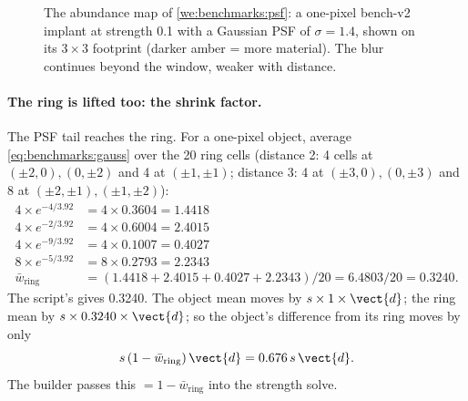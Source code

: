 \begin{figure}[htbp]
\centering
{}
\caption{The abundance map of \cref{we:benchmarks:psf}: a one-pixel bench-v2 implant at strength 0.1 with a Gaussian
PSF of $\sigma = 1.4$, shown on its $3 \times 3$ footprint (darker amber = more material). The blur continues
beyond the window, weaker with distance.}
\label{fig:benchmarks:abund}
\end{figure}

\paragraph{The ring is lifted too: the shrink factor.} The PSF tail reaches the ring. For a one-pixel object, average
\cref{eq:benchmarks:gauss} over the 20 ring cells (distance 2: 4 cells at $(\pm2,0),(0,\pm2)$ and 4 at
$(\pm1,\pm1)$; distance 3: 4 at $(\pm3,0),(0,\pm3)$ and 8 at $(\pm2,\pm1),(\pm1,\pm2)$):
\begin{align*}
4 \times e^{-4/3.92} &= 4 \times 0.3604 = 1.4418\\
4 \times e^{-2/3.92} &= 4 \times 0.6004 = 2.4015\\
4 \times e^{-9/3.92} &= 4 \times 0.1007 = 0.4027\\
8 \times e^{-5/3.92} &= 8 \times 0.2793 = 2.2343\\
\bar w_{\text{ring}} &= (1.4418 + 2.4015 + 0.4027 + 2.2343) / 20 = 6.4803 / 20 = 0.3240.
\end{align*}
The script's  gives 0.3240\tagC{}. The object mean moves by $s \times 1 \times \vect{d}$; the ring mean
by $s \times 0.3240 \times \vect{d}$; so the object's difference from its ring moves by only
\begin{equation}\label{eq:benchmarks:shrink}
s\,(1 - \bar w_{\text{ring}})\,\vect{d} = 0.676\,s\,\vect{d}.
\end{equation}
The builder passes this  $= 1 - \bar w_{\text{ring}}$ into the strength solve.

